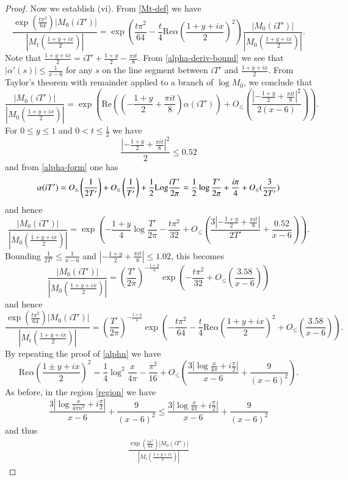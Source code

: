 \begin{proof}
Now we establish (vi).  From \eqref{Mt-def} we have
$$\frac{\exp\left( \frac{t \pi^2}{64}\right) |M_0(iT')|}{|M_t(\frac{1+y+ix}{2})|}
= \exp\left( \frac{t \pi^2}{64} - \frac{t}{4} \mathrm{Re} \alpha\left(\frac{1+y+ix}{2}\right)^2\right) \frac{|M_0(iT')|}{|M_0\left(\frac{1+y+ix}{2}\right)|}.$$
Note that $\frac{1+y+ix}{2} = iT' + \frac{1+y}{2} - \frac{\pi i t}{8}$.  From \eqref{alpha-deriv-bound} we see that $|\alpha'(s)| \leq \frac{1}{x-6}$ for any $s$ on the line segment between $iT'$ and $\frac{1+y+ix}{2}$.  From Taylor's theorem with remainder applied to a branch of $\log M_0$, we conclude that
$$ \frac{|M_0(iT')|}{|M_0(\frac{1+y+ix}{2})|} = \exp\left( \mathrm{Re}\left( \left(-\frac{1+y}{2}+\frac{\pi i t}{8}\right) \alpha(iT') \right) + O_{\leq}\left( \frac{|-\frac{1+y}{2}+\frac{\pi i t}{8}|^2}{2(x-6)} \right) \right).$$
For $0 \leq y \leq 1$ and $0 < t \leq \frac{1}{2}$ we have
$$\frac{|-\frac{1+y}{2}+\frac{\pi i t}{8}|^2}{2} \leq 0.52$$
and from \eqref{alpha-form} one has
$$ \alpha(iT') = O_{\leq}\left(\frac{1}{2T'}\right) +  O_{\leq}\left(\frac{1}{T'}\right) + \frac{1}{2} {\operatorname{Log}} \frac{iT'}{2\pi} = \frac{1}{2} \log \frac{T'}{2\pi} + \frac{i\pi}{4} + O_{\leq}( \frac{3}{2T'} ) $$
and hence
$$
\frac{|M_0(iT')|}{|M_0\left(\frac{1+y+ix}{2}\right)|}
= \exp\left( -\frac{1+y}{4} \log \frac{T'}{2\pi} - \frac{t\pi^2}{32} + O_{\leq}\left( \frac{3|-\frac{1+y}{2}+\frac{\pi i t}{8}|}{2T'} + \frac{0.52}{x-6} \right) \right).$$
Bounding $\frac{1}{2T'} \leq \frac{1}{x-6}$ and $|-\frac{1+y}{2}+\frac{\pi i t}{8}| \leq 1.02$, this becomes
$$
\frac{|M_0(iT')|}{|M_0\left(\frac{1+y+ix}{2}\right)|}
= \left(\frac{T'}{2\pi}\right)^{-\frac{1+y}{4}} \exp\left( - \frac{t\pi^2}{32} + O_{\leq}\left( \frac{3.58}{x-6} \right) \right)$$
and hence
$$\frac{\exp\left( \frac{t \pi^2}{64}\right) |M_0(iT')|}{|M_t(\frac{1+y+ix}{2})|} 
= \left(\frac{T'}{2\pi}\right)^{-\frac{1+y}{4}} \exp\left( - \frac{t \pi^2}{64} - \frac{t}{4} \mathrm{Re} \alpha\left(\frac{1+y+ix}{2}\right)^2 + O_{\leq}\left( \frac{3.58}{x-6} \right) \right).$$
By repeating the proof of \eqref{alphn} we have
$$
\mathrm{Re} \alpha(\frac{1 \pm y + ix}{2})^2 = \frac{1}{4} \log^2 \frac{x}{4\pi} - \frac{\pi^2}{16} + 
O_{\leq}\left( \frac{3 |\log \frac{x}{4\pi} + i \frac{\pi}{2}|}{x-6} + \frac{9}{(x-6)^2}\right).
$$
As before, in the region \eqref{region} we have
$$\frac{3 |\log \frac{x}{4\pi n^2} + i \frac{\pi}{2}|}{x-6} + \frac{9}{(x-6)^2} \leq \frac{3 |\log \frac{x}{4\pi} + i \frac{\pi}{2}|}{x-6} + \frac{9}{(x-6)^2}
$$
and thus
\begin{align*}
\frac{\exp\left( \frac{t \pi^2}{64}\right) |M_0(iT')|}{\left|M_t\left(\frac{1+y+ix}{2}\right)\right|}

\end{align*}
\end{proof}
